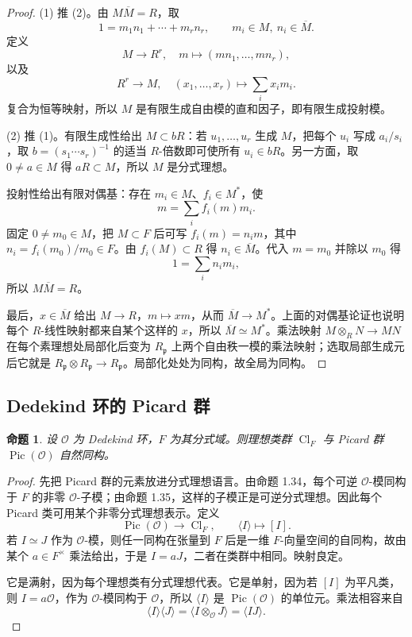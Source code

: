 \documentclass[11pt,a4paper,openany]{ctexbook}
\numberwithin{equation}{chapter}
\newcommand{\Cl}{\operatorname{Cl}}
\newcommand{\Pic}{\operatorname{Pic}}
\theoremstyle{plain}
\newtheorem{proposition}[theorem]{命题}
\theoremstyle{definition}
\theoremstyle{remark}
\begin{document}
\begin{proof}
(1) 推 (2)。由 $M\overline M=R$，取
\[
1=m_1n_1+\cdots+m_rn_r,\qquad m_i\in M,\ n_i\in\overline M.
\]
定义
\[
M\to R^r,\quad m\mapsto(mn_1,\dots,mn_r),
\]
以及
\[
R^r\to M,\quad (x_1,\dots,x_r)\mapsto\sum_i x_im_i.
\]
复合为恒等映射，所以 $M$ 是有限生成自由模的直和因子，即有限生成投射模。

(2) 推 (1)。有限生成性给出 $M\subset bR$：若
$u_1,\dots,u_r$ 生成 $M$，把每个 $u_i$ 写成 $a_i/s_i$，取
$b=(s_1\cdots s_r)^{-1}$ 的适当 $R$-倍数即可使所有 $u_i\in bR$。另一方面，取
$0\ne a\in M$ 得 $aR\subset M$，所以 $M$ 是分式理想。

投射性给出有限对偶基：存在 $m_i\in M$、$f_i\in M^*$，使
\[
m=\sum_i f_i(m)m_i.
\]
固定 $0\ne m_0\in M$，把 $M\subset F$ 后可写 $f_i(m)=n_im$，其中 $n_i=f_i(m_0)/m_0\in F$。由 $f_i(M)\subset R$ 得 $n_i\in\overline M$。代入 $m=m_0$ 并除以 $m_0$ 得
\[
1=\sum_i n_im_i,
\]
所以 $M\overline M=R$。

最后，$x\in\overline M$ 给出 $M\to R$，$m\mapsto xm$，从而
$\overline M\to M^*$。上面的对偶基论证也说明每个 $R$-线性映射都来自某个这样的
$x$，所以 $\overline M\simeq M^*$。乘法映射
$M\otimes_RN\to MN$ 在每个素理想处局部化后变为
$R_{\mathfrak p}$ 上两个自由秩一模的乘法映射；选取局部生成元后它就是
$R_{\mathfrak p}\otimes R_{\mathfrak p}\to R_{\mathfrak p}$。局部化处处为同构，故全局为同构。
\end{proof}

\subsection{Dedekind 环的 Picard 群}

\begin{proposition}
设 $\mathcal O$ 为 Dedekind 环，$F$ 为其分式域。则理想类群 $\Cl_F$ 与 Picard 群 $\Pic(\mathcal O)$ 自然同构。
\end{proposition}

\begin{proof}
先把 Picard 群的元素放进分式理想语言。由命题 1.34，每个可逆
$\mathcal O$-模同构于 $F$ 的非零 $\mathcal O$-子模；由命题 1.35，这样的子模正是可逆分式理想。因此每个 Picard 类可用某个非零分式理想表示。定义
\[
\Pic(\mathcal O)\longrightarrow\Cl_F,\qquad
\langle I\rangle\longmapsto[I].
\]
若 $I\simeq J$ 作为 $\mathcal O$-模，则任一同构在张量到 $F$ 后是一维 $F$-向量空间的自同构，故由某个 $a\in F^\times$ 乘法给出，于是 $I=aJ$，二者在类群中相同。映射良定。

它是满射，因为每个理想类有分式理想代表。它是单射，因为若 $[I]$ 为平凡类，则 $I=a\mathcal O$，作为 $\mathcal O$-模同构于 $\mathcal O$，所以 $\langle I\rangle$ 是 $\Pic(\mathcal O)$ 的单位元。乘法相容来自
\[
\langle I\rangle\langle J\rangle
=\langle I\otimes_{\mathcal O}J\rangle
=\langle IJ\rangle.
\]
\end{proof}
\end{document}

